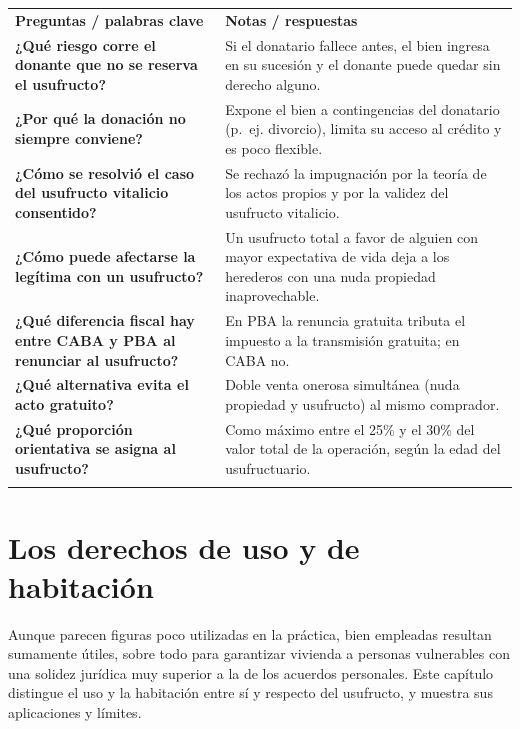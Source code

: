 \documentclass[12pt,oneside]{book}
\newcommand{\cq}[1]{\textbf{#1}}
\newcommand{\cornell}[3]{%
  \par\medskip\noindent\begingroup
  \renewcommand{\arraystretch}{1.25}%
  \begin{tabularx}{\textwidth}{|>{\raggedright\arraybackslash}p{0.27\textwidth}|>{\raggedright\arraybackslash}X|}
    \hline
    \multicolumn{2}{|>{\centering\arraybackslash}X|}{\cellcolor{azulacad!12}\textbf{Cuadro Cornell --- #1}}\\ \hline
    \cellcolor{gray!10}\textbf{Preguntas / palabras clave} & \cellcolor{gray!10}\textbf{Notas / respuestas} \\ \hline
    #2
    \multicolumn{2}{|>{\raggedright\arraybackslash}X|}{\cellcolor{azulacad!6}\textbf{Resumen.} #3}\\ \hline
  \end{tabularx}%
  \endgroup\par\medskip}
\begin{document}
\cornell{El usufructo en la planificación patrimonial y sus aspectos fiscales}{
\cq{¿Qué riesgo corre el donante que no se reserva el usufructo?} & Si el donatario fallece antes, el bien ingresa en su sucesión y el donante puede quedar sin derecho alguno. \\ \hline
\cq{¿Por qué la donación no siempre conviene?} & Expone el bien a contingencias del donatario (p.~ej. divorcio), limita su acceso al crédito y es poco flexible. \\ \hline
\cq{¿Cómo se resolvió el caso del usufructo vitalicio consentido?} & Se rechazó la impugnación por la teoría de los actos propios y por la validez del usufructo vitalicio. \\ \hline
\cq{¿Cómo puede afectarse la legítima con un usufructo?} & Un usufructo total a favor de alguien con mayor expectativa de vida deja a los herederos con una nuda propiedad inaprovechable. \\ \hline
\cq{¿Qué diferencia fiscal hay entre CABA y PBA al renunciar al usufructo?} & En PBA la renuncia gratuita tributa el impuesto a la transmisión gratuita; en CABA no. \\ \hline
\cq{¿Qué alternativa evita el acto gratuito?} & Doble venta onerosa simultánea (nuda propiedad y usufructo) al mismo comprador. \\ \hline
\cq{¿Qué proporción orientativa se asigna al usufructo?} & Como máximo entre el 25\% y el 30\% del valor total de la operación, según la edad del usufructuario. \\ \hline
}{El usufructo permite ordenar el patrimonio en vida, pero exige evaluar riesgos y costos: la donación puede exponer y limitar al donatario, el usufructo total puede afectar la legítima y la cancelación o la venta tienen efectos impositivos distintos según la jurisdicción. La valuación debe ser razonable y guardar relación con la expectativa de vida.}

\chapter{Los derechos de uso y de habitación}
\label{cap:usohab}

Aunque parecen figuras poco utilizadas en la práctica, bien empleadas resultan sumamente útiles, sobre todo para garantizar vivienda a personas vulnerables con una solidez jurídica muy superior a la de los acuerdos personales. Este capítulo distingue el uso y la habitación entre sí y respecto del usufructo, y muestra sus aplicaciones y límites.
\end{document}

